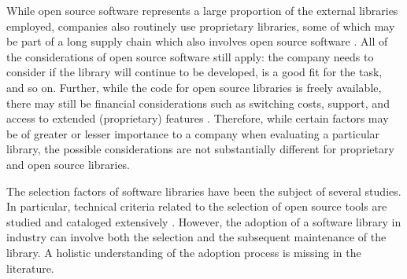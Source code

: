 \documentclass[sigconf,review,anonymous, table]{acmart}
\begin{document}
While open source software represents a large proportion of the external libraries employed, companies also routinely use proprietary libraries, some of which may be part of a long supply chain which also involves open source software \cite{harutyunyan:2018:understanding}. All of the considerations of open source software still apply: the company needs to consider if the library will continue to be developed, is a good fit for the task, and so on. Further, while the code for open source libraries is freely available, there may still be financial considerations such as switching costs, support, and access to extended (proprietary) features \cite{dahlander2006business}. Therefore, while certain factors may be of greater or lesser importance to a company when evaluating a particular library, the possible considerations are not substantially different for proprietary and open source libraries. 


The selection factors of software libraries have been the subject of several studies. In particular, technical criteria related to the selection of open source tools are studied and cataloged extensively \cite{wasserman2017osspal, li2022exploring, larios2020selecting, huang2018tell, wang2020difftech, wang2021difftech, uddin2017automatic, uddin2017opiner, de2018library, de2018empirical, el2020libcomp, yan2022concept, liu2021api, uddin2019understanding, larios2020selecting}. However, the adoption of a software library in industry can involve both the selection and the subsequent maintenance of the library. 
A holistic understanding of the adoption process is missing in the literature. 
\end{document}
